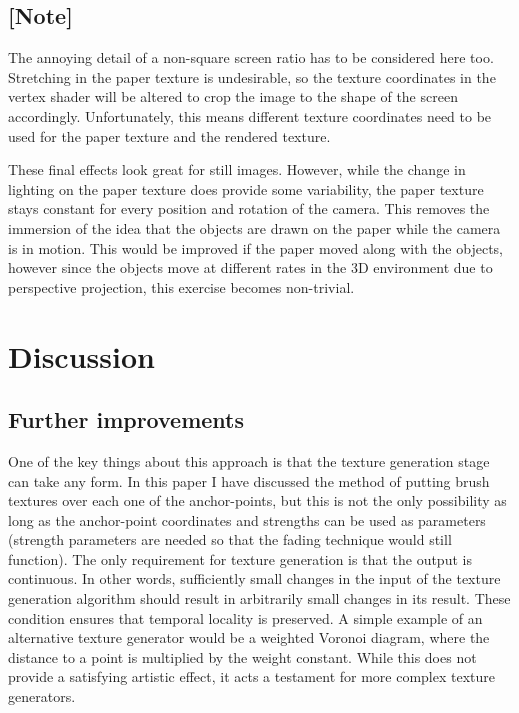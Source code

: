 \documentclass[a4paper, 12pt]{article}
\begin{document}
\subsection{[Note]}
The annoying detail of a non-square screen ratio has to be considered here too. Stretching in the paper texture is undesirable, so the texture coordinates in the vertex shader will be altered to crop the image to the shape of the screen accordingly. Unfortunately, this means different texture coordinates need to be used for the paper texture and the rendered texture.

These final effects look great for still images. However, while the change in lighting on the paper texture does provide some variability, the paper texture stays constant for every position and rotation of the camera. This removes the immersion of the idea that the objects are drawn on the paper while the camera is in motion. This would be improved if the paper moved along with the objects, however since the objects move at different rates in the 3D environment due to perspective projection, this exercise becomes non-trivial.



\section{Discussion}

\subsection{Further improvements}

One of the key things about this approach is that the texture generation stage can take any form. In this paper I have discussed the method of putting brush textures over each one of the anchor-points, but this is not the only possibility as long as the anchor-point coordinates and strengths can be used as parameters (strength parameters are needed so that the fading technique would still function). The only requirement for texture generation is that the output is continuous. In other words, sufficiently small changes in the input of the texture generation algorithm should result in arbitrarily small changes in its result. These condition ensures that temporal locality is preserved. A simple example of an alternative texture generator would be a weighted Voronoi diagram, where the distance to a point is multiplied by the weight constant. While this does not provide a satisfying artistic effect, it acts a testament for more complex texture generators.
\end{document}
